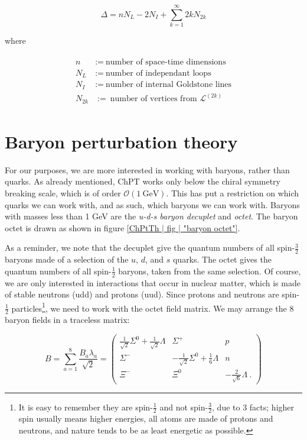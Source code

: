 \documentclass[10pt,twoside]{report}
\begin{document}
	\begin{equation}
		\Delta = nN_L - 2N_I + \sum_{k=1}^\infty 2kN_{2k}
	\end{equation}
	
	\noindent where
	
	\begin{align}
		\begin{split}
			n &:=\: \text{number of space-time dimensions} \\
			N_L &:=\: \text{number of independant loops} \\
			N_I &:=\: \text{number of internal Goldstone lines} \\
			N_{2k} &:=\: \text{number of vertices from $\mathcal{L}^{(2k)}$}
		\end{split}
	\end{align}
	
	\section{Baryon perturbation theory}
	For our purposes, we are more interested in working with baryons, rather than quarks. As already mentioned, ChPT works only below the chiral symmetry breaking scale, which is of order $\mathcal{O}(1\:\text{GeV})$. This has put a restriction on which quarks we can work with, and as such, which baryons we can work with. Baryons with masses less 
	than 1 GeV are the \emph{u-d-s baryon decuplet} and \emph{octet}. The baryon octet is drawn as shown in figure \ref{ChPtTh | fig | "baryon octet"}. 
	
	
	
	As a reminder, we note that the decuplet give the quantum numbers of all spin-$\frac{3}{2}$ baryons made of a selection of the $u$, $d$, and $s$ quarks. The octet gives the quantum numbers of all spin-$\frac{1}{2}$ baryons, taken from the same selection. Of course, we are only interested in interactions that occur in nuclear matter, which is made of stable neutrons (udd) and protons (uud). Since protons and neutrons are spin-$\frac{1}{2}$ particles\footnote{It is easy to remember they are spin-$\frac{1}{2}$ and not spin-$\frac{3}{2}$, due to 3 facts; higher spin usually means higher energies, all atoms are made of protons and neutrons, and nature tends to be as least energetic as possible.}, we need to work with the octet field matrix. We may arrange the 8 baryon fields in a traceless matrix:
	
	\begin{equation}
		B = \sum_{a=1}^8 \frac{B_a\lambda_a}{\sqrt{2}} = \begin{pmatrix}
		\frac{1}{\sqrt{2}}\Sigma^0 + \frac{1}{\sqrt{2}}\Lambda & \Sigma^+ & p \\
		\Sigma^- & -\frac{1}{\sqrt{2}}\Sigma^0 + \frac{1}{6}\Lambda & n \\
		\Xi^- & \Xi^0 & -\frac{2}{\sqrt{6}}\Lambda \:.
		\end{pmatrix}
	\end{equation}
	
\end{document}
